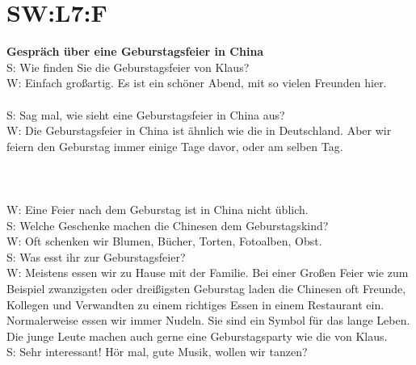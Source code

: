 \section{SW:L7:F}
\noindent
\textbf{Gespräch über eine Geburstagsfeier in China} \\
S: Wie finden Sie die Geburstagsfeier von Klaus? \\
W: Einfach großartig. Es ist ein schöner Abend, mit so vielen Freunden hier. \\
\\
\noindent
S: Sag mal, wie sieht eine Geburstagsfeier in China aus?  \\
W: Die Geburstagsfeier in China ist ähnlich wie die in Deutschland.  Aber wir feiern den Geburstag immer einige Tage davor, oder am selben Tag.  \\
\\
\\
\\
\noindent
W: Eine Feier nach dem Geburstag ist in China nicht üblich. \\
S: Welche Geschenke machen die Chinesen dem Geburstagskind? \\
W: Oft schenken wir Blumen, Bücher, Torten, Fotoalben, Obst. \\
S: Was esst ihr zur Geburstagsfeier? \\
W: Meistens essen wir zu Hause mit der Familie. Bei einer Großen Feier wie zum Beispiel zwanzigsten oder dreißigsten  Geburstag laden die Chinesen oft Freunde, Kollegen und Verwandten  zu einem richtiges Essen in einem Restaurant ein. Normalerweise essen wir immer Nudeln. Sie sind ein Symbol für das lange Leben.  Die junge Leute machen auch gerne  eine Geburstagsparty wie die von Klaus.\\
S: Sehr interessant! Hör mal, gute Musik, wollen wir tanzen? \\

